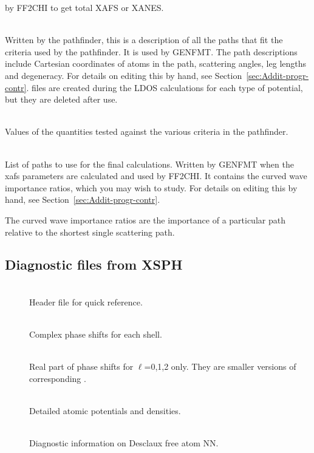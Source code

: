 \documentclass[11pt,oneside]{report} %
\begin{document}
\begin{description}
  by FF2CHI to get total XAFS or XANES.
\item[\file{paths.dat}]\hfill\\ Written by the pathfinder, this is a
  description of all the paths that fit the criteria used by the
  pathfinder.  It is used by GENFMT. The path descriptions include
  Cartesian coordinates of atoms in the path, scattering angles, leg
  lengths and degeneracy. For details on editing this by hand, see
  Section~\ref{sec:Addit-progr-contr}.   files are
  created during the LDOS calculations for each type of potential, but
  they are deleted after use.
\item[\file{crit.dat}]\hfill\\ Values of the quantities tested against the
  various criteria in the pathfinder.
\item[\file{list.dat}]\hfill\\ List of paths to use for the final calculations.
  Written by GENFMT when the xafs parameters are calculated and used
  by FF2CHI.  It contains the curved wave importance ratios, which
  you may wish to study. For details on editing this by hand, see
  Section~\ref{sec:Addit-progr-contr}.

  The curved wave importance ratios are the importance of a particular
  path relative to the shortest single scattering path.
\end{description}



\subsection{Diagnostic files from XSPH}
\label{sec:Diagn-Files-from}

\begin{description}
\item[]\hfill\\ Header file for quick reference.
\item[] \hfill\\ Complex phase shifts for each
  shell.
\item[] \hfill\\ Real part of phase shifts for
  $\ell$=0,1,2 only. They are smaller versions of corresponding
  .
\item[]\hfill\\  Detailed atomic potentials and
  densities.
\item[] \hfill\\ Diagnostic information on Desclaux
  free atom NN.
\end{description}
\end{document}
